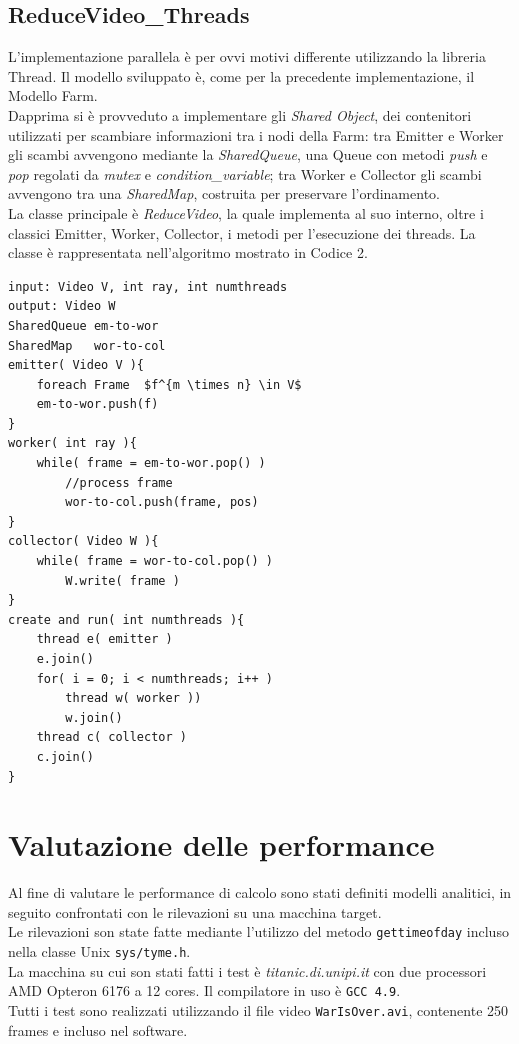 \documentclass[12pt]{article}
\begin{document}
\subsection{ReduceVideo\_Threads}
L'implementazione parallela \`e per ovvi motivi differente utilizzando la libreria Thread. Il modello sviluppato \`e, come per la precedente implementazione, il Modello Farm. 
\\Dapprima si \`e provveduto a implementare gli \textit{Shared Object}, dei contenitori utilizzati per scambiare informazioni tra i nodi della Farm: tra Emitter e Worker gli scambi avvengono mediante la \textit{SharedQueue}, una Queue con metodi \textit{push} e \textit{pop} regolati da \textit{mutex} e \textit{condition\_variable}; tra Worker e Collector gli scambi avvengono tra una \textit{SharedMap}, costruita per preservare l'ordinamento. 
\\La classe principale \`e \textit{ReduceVideo}, la quale implementa al suo interno, oltre i classici Emitter, Worker, Collector, i metodi per l'esecuzione dei threads. La classe \`e rappresentata nell'algoritmo mostrato in Codice 2. 

\begin{lstlisting}[backgroundcolor=\color{White}, caption={Pseudo-code ReduceVideo\_Threads}, mathescape=true] 
input: Video V, int ray, int numthreads
output: Video W
SharedQueue em-to-wor
SharedMap   wor-to-col
emitter( Video V ){
	foreach Frame  $f^{m \times n} \in V$
	em-to-wor.push(f)
}
worker( int ray ){
	while( frame = em-to-wor.pop() )
		//process frame
		wor-to-col.push(frame, pos)
}
collector( Video W ){
	while( frame = wor-to-col.pop() )
		W.write( frame )
}
create and run( int numthreads ){
	thread e( emitter )
	e.join()
	for( i = 0; i < numthreads; i++ )
		thread w( worker ))
		w.join()
	thread c( collector )
	c.join() 
}
\end{lstlisting}


\section{Valutazione delle performance}
Al fine di valutare le performance di calcolo sono stati definiti modelli analitici, in seguito confrontati con le rilevazioni su una macchina target. 
\\Le rilevazioni son state fatte mediante l'utilizzo del metodo \texttt{gettimeofday} incluso nella classe Unix \texttt{sys/tyme.h}. 
\\La macchina su cui son stati fatti i test \`e \textit{titanic.di.unipi.it} con due processori AMD Opteron 6176 a 12 cores. Il compilatore in uso \`e \texttt{GCC 4.9}.
\\Tutti i test sono realizzati utilizzando il file video \texttt{WarIsOver.avi}, contenente 250 frames e incluso nel software.
\end{document}
